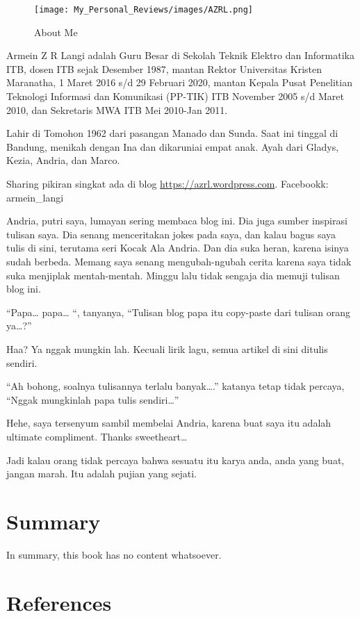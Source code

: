 \documentclass[
  letterpaper,
  DIV=11,
  numbers=noendperiod]{scrreprt}
\begin{document}

\begin{figure}[H]

{\centering \texttt{[image: My\_Personal\_Reviews/images/AZRL.png]}

}

\caption{About Me}

\end{figure}%

Armein Z R Langi adalah Guru Besar di Sekolah Teknik Elektro dan
Informatika ITB, dosen ITB sejak Desember 1987, mantan Rektor
Universitas Kristen Maranatha, 1 Maret 2016 s/d 29 Februari 2020, mantan
Kepala Pusat Penelitian Teknologi Informasi dan Komunikasi (PP-TIK) ITB
November 2005 s/d Maret 2010, dan Sekretaris MWA ITB Mei 2010-Jan 2011.

Lahir di Tomohon 1962 dari pasangan Manado dan Sunda. Saat ini tinggal
di Bandung, menikah dengan Ina dan dikaruniai empat anak. Ayah dari
Gladys, Kezia, Andria, dan Marco.

Sharing pikiran singkat ada di blog \url{https://azrl.wordpress.com}.
Facebookk: armein\_langi

Andria, putri saya, lumayan sering membaca blog ini. Dia juga sumber
inspirasi tulisan saya. Dia senang menceritakan jokes pada saya, dan
kalau bagus saya tulis di sini, terutama seri Kocak Ala Andria. Dan dia
suka heran, karena isinya sudah berbeda. Memang saya senang
mengubah-ngubah cerita karena saya tidak suka menjiplak mentah-mentah.
Minggu lalu tidak sengaja dia memuji tulisan blog ini.

``Papa\ldots{} papa\ldots{} ``, tanyanya, ``Tulisan blog papa itu
copy-paste dari tulisan orang ya\ldots?''

Haa? Ya nggak mungkin lah. Kecuali lirik lagu, semua artikel di sini
ditulis sendiri.

``Ah bohong, soalnya tulisannya terlalu banyak\ldots.'' katanya tetap
tidak percaya, ``Nggak mungkinlah papa tulis sendiri\ldots{}''

Hehe, saya tersenyum sambil membelai Andria, karena buat saya itu adalah
ultimate compliment. Thanks sweetheart\ldots{}

Jadi kalau orang tidak percaya bahwa sesuatu itu karya anda, anda yang
buat, jangan marah. Itu adalah pujian yang sejati.


\chapter{Summary}\label{summary}

In summary, this book has no content whatsoever.


\chapter*{References}\label{references}


\label{refs}
\end{document}
